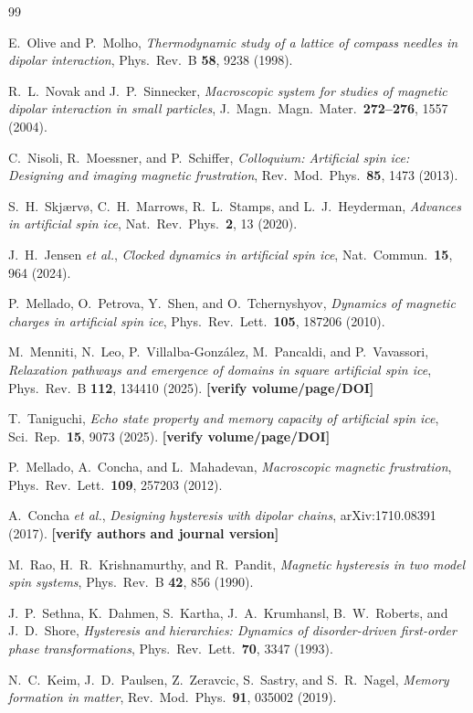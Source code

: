 \documentclass[11pt,a4paper]{article}
\providecommand{\todo}[1]{\textcolor{red!70!black}{\textbf{[#1]}}}
\begin{document}
\begin{thebibliography}{99}

E.~Olive and P.~Molho, \emph{Thermodynamic study of a lattice of compass needles in dipolar interaction}, Phys.\ Rev.\ B \textbf{58}, 9238 (1998).

R.~L.~Novak and J.~P.~Sinnecker, \emph{Macroscopic system for studies of magnetic dipolar interaction in small particles}, J.\ Magn.\ Magn.\ Mater.\ \textbf{272--276}, 1557 (2004).

C.~Nisoli, R.~Moessner, and P.~Schiffer, \emph{Colloquium: Artificial spin ice: Designing and imaging magnetic frustration}, Rev.\ Mod.\ Phys.\ \textbf{85}, 1473 (2013).

S.~H.~Skj\ae rv\o, C.~H.~Marrows, R.~L.~Stamps, and L.~J.~Heyderman, \emph{Advances in artificial spin ice}, Nat.\ Rev.\ Phys.\ \textbf{2}, 13 (2020).

J.~H.~Jensen \emph{et al.}, \emph{Clocked dynamics in artificial spin ice}, Nat.\ Commun.\ \textbf{15}, 964 (2024).

P.~Mellado, O.~Petrova, Y.~Shen, and O.~Tchernyshyov, \emph{Dynamics of magnetic charges in artificial spin ice}, Phys.\ Rev.\ Lett.\ \textbf{105}, 187206 (2010).

M.~Menniti, N.~Leo, P.~Villalba-Gonz\'alez, M.~Pancaldi, and P.~Vavassori, \emph{Relaxation pathways and emergence of domains in square artificial spin ice}, Phys.\ Rev.\ B \textbf{112}, 134410 (2025). \todo{verify volume/page/DOI}

T.~Taniguchi, \emph{Echo state property and memory capacity of artificial spin ice}, Sci.\ Rep.\ \textbf{15}, 9073 (2025). \todo{verify volume/page/DOI}

P.~Mellado, A.~Concha, and L.~Mahadevan, \emph{Macroscopic magnetic frustration}, Phys.\ Rev.\ Lett.\ \textbf{109}, 257203 (2012).

A.~Concha \emph{et al.}, \emph{Designing hysteresis with dipolar chains}, arXiv:1710.08391 (2017). \todo{verify authors and journal version}

M.~Rao, H.~R.~Krishnamurthy, and R.~Pandit, \emph{Magnetic hysteresis in two model spin systems}, Phys.\ Rev.\ B \textbf{42}, 856 (1990).

J.~P.~Sethna, K.~Dahmen, S.~Kartha, J.~A.~Krumhansl, B.~W.~Roberts, and J.~D.~Shore, \emph{Hysteresis and hierarchies: Dynamics of disorder-driven first-order phase transformations}, Phys.\ Rev.\ Lett.\ \textbf{70}, 3347 (1993).

N.~C.~Keim, J.~D.~Paulsen, Z.~Zeravcic, S.~Sastry, and S.~R.~Nagel, \emph{Memory formation in matter}, Rev.\ Mod.\ Phys.\ \textbf{91}, 035002 (2019).

\end{thebibliography}
\end{document}
